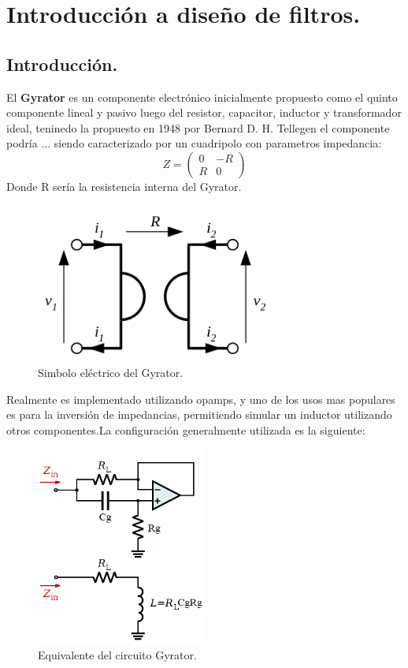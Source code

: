 \documentclass[a4paper]{article}
\begin{document}
\section{Introducción a diseño de filtros.}
\subsection{Introducción.}
El \textbf{Gyrator} es un componente electrónico inicialmente propuesto como el quinto componente lineal y pasivo luego del resistor, capacitor, inductor y transformador ideal, teninedo la propuesto en 1948 por Bernard D. H. Tellegen el componente podría ... siendo caracterizado por un cuadripolo con parametros impedancia:
$$ Z= \left(\begin{matrix}0&-R\\R&0\end{matrix}\right) $$
Donde R sería la resistencia interna del Gyrator.

\begin{figure}[H]	
	\centering
	\includegraphics[width=0.7\textwidth]{ImagenesEj2/gyratorsimb.png}
	\caption{Simbolo eléctrico del Gyrator.}
	\label{fig:gyrsimb}
\end{figure}
Realmente es implementado utilizando opamps, y uno de los usos mas populares es para la inversión de impedancias, permitiendo simular un inductor utilizando otros componentes.La configuración generalmente utilizada es la siguiente:
\begin{figure}[H]	
	\centering
	\includegraphics[width=0.5\textwidth]{ImagenesEj2/gyrop.png}
	\caption{Equivalente del circuito Gyrator.}
	\label{fig:gyrop}
\end{figure}
\end{document}
